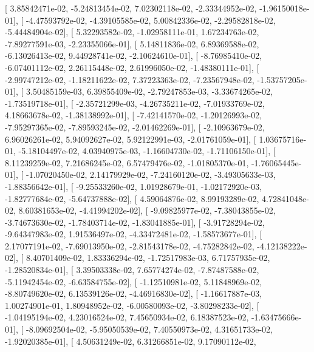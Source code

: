 \documentclass{article}
\begin{document}
       [  3.85842471e-02,  -5.24813454e-02,   7.02302118e-02,
         -2.33344952e-02,  -1.96150018e-01],
       [ -4.47593792e-02,  -4.39105585e-02,   5.00842336e-02,
         -2.29582818e-02,  -5.44484904e-02],
       [  5.32293582e-02,  -1.02958111e-01,   1.67234763e-02,
         -7.89277591e-03,  -2.23355066e-01],
       [  5.14811836e-02,   6.89369588e-02,  -6.13026413e-02,
          9.44928741e-02,  -2.10624610e-01],
       [ -8.76985410e-02,  -6.07401112e-02,   2.26115448e-02,
          2.61996050e-02,  -1.48380111e-01],
       [ -2.99747212e-02,  -1.18211622e-02,   7.37223363e-02,
         -7.23567948e-02,  -1.53757205e-01],
       [  3.50485159e-03,   6.39855409e-02,  -2.79247853e-03,
         -3.33674265e-02,  -1.73519718e-01],
       [ -2.35721299e-03,  -4.26735211e-02,  -7.01933769e-02,
          4.18663678e-02,  -1.38138992e-01],
       [ -7.42141570e-02,  -1.20126993e-02,  -7.95297365e-02,
         -7.89593245e-02,  -2.01462269e-01],
       [ -2.10963679e-02,   6.96026261e-02,   5.94092627e-02,
          5.92122991e-03,  -2.01761059e-01],
       [  1.03675716e-01,  -5.18104497e-02,   4.03940975e-03,
         -1.16604730e-02,  -1.71106150e-01],
       [  8.11239259e-02,   7.21686245e-02,   6.57479476e-02,
         -1.01805370e-01,  -1.76065445e-01],
       [ -1.07020450e-02,   2.14179929e-02,  -7.24160120e-02,
         -3.49305633e-03,  -1.88356642e-01],
       [ -9.25533260e-02,   1.01928679e-01,  -1.02172920e-03,
         -1.82777684e-02,  -5.64737888e-02],
       [  4.59064876e-02,   8.99193289e-02,   4.72841048e-02,
          8.60381653e-02,  -4.41994202e-02],
       [ -9.09825977e-02,  -7.38043855e-02,  -3.74673630e-02,
         -1.78403714e-02,  -1.83041885e-01],
       [ -3.91728294e-02,  -9.64347983e-02,   1.91536497e-02,
         -4.33472481e-02,  -1.58573677e-01],
       [  2.17077191e-02,  -7.69013950e-02,  -2.81543178e-02,
         -4.75282842e-02,  -4.12138222e-02],
       [  8.40701409e-02,   1.83336294e-02,  -1.72517983e-03,
          6.71757935e-02,  -1.28520834e-01],
       [  3.39503338e-02,   7.65774274e-02,  -7.87487588e-02,
         -5.11942454e-02,  -6.63584755e-02],
       [ -1.12510981e-02,   5.11848969e-02,  -8.80749620e-02,
          6.13539126e-02,  -4.46916830e-02],
       [ -1.16617887e-03,   1.00274901e-01,   1.80948952e-02,
         -6.00580093e-02,  -3.80298233e-02],
       [ -1.04195194e-02,   4.23016524e-02,   7.45650934e-02,
          6.18387523e-02,  -1.63475666e-01],
       [ -8.09692504e-02,  -5.95050539e-02,   7.40550973e-02,
          4.31651733e-02,  -1.92020385e-01],
       [  4.50631249e-02,   6.31266851e-02,   9.17090112e-02,
\end{document}
